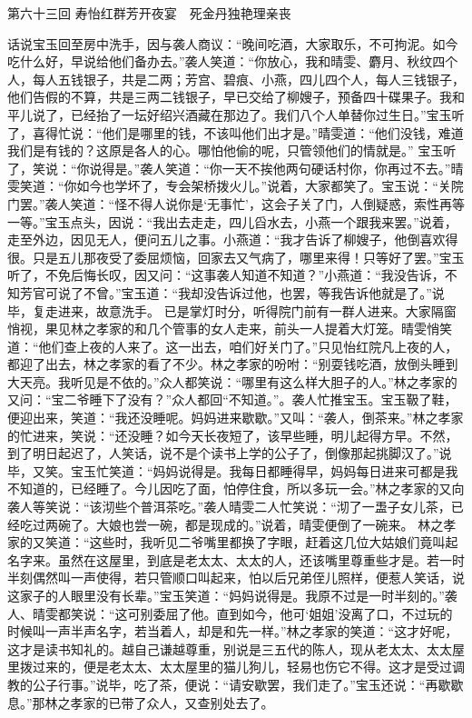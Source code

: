 \documentclass[12pt,oneside]{book}
\begin{document}
 
第六十三回  寿怡红群芳开夜宴　死金丹独艳理亲丧


话说宝玉回至房中洗手，因与袭人商议：“晚间吃酒，大家取乐，不可拘泥。如今吃什么好，早说给他们备办去。”袭人笑道：“你放心，我和晴雯、麝月、秋纹四个人，每人五钱银子，共是二两；芳宫、碧痕、小燕，四儿四个人，每人三钱银子，他们告假的不算，共是三两二钱银子，早已交给了柳嫂子，预备四十碟果子。我和平儿说了，已经抬了一坛好绍兴酒藏在那边了。我们八个人单替你过生日。”宝玉听了，喜得忙说：“他们是哪里的钱，不该叫他们出才是。”晴雯道：“他们没钱，难道我们是有钱的？这原是各人的心。哪怕他偷的呢，只管领他们的情就是。”
宝玉听了，笑说：“你说得是。”袭人笑道：“你一天不挨他两句硬话村你，你再过不去。”晴雯笑道：“你如今也学坏了，专会架桥拨火儿。”说着，大家都笑了。宝玉说：“关院门罢。”袭人笑道：“怪不得人说你是‘无事忙’，这会子关了门，人倒疑惑，索性再等一等。”宝玉点头，因说：“我出去走走，四儿舀水去，小燕一个跟我来罢。”说着，走至外边，因见无人，便问五儿之事。小燕道：“我才告诉了柳嫂子，他倒喜欢得很。只是五儿那夜受了委屈烦恼，回家去又气病了，哪里来得！只等好了罢。”宝玉听了，不免后悔长叹，因又问：“这事袭人知道不知道？”小燕道：“我没告诉，不知芳官可说了不曾。”宝玉道：“我却没告诉过他，也罢，等我告诉他就是了。”说毕，复走进来，故意洗手。
已是掌灯时分，听得院门前有一群人进来。大家隔窗悄视，果见林之孝家的和几个管事的女人走来，前头一人提着大灯笼。晴雯悄笑道：“他们查上夜的人来了。这一出去，咱们好关门了。”只见怡红院凡上夜的人，都迎了出去，林之孝家的看了不少。林之孝家的吩咐：“别耍钱吃酒，放倒头睡到大天亮。我听见是不依的。”众人都笑说：“哪里有这么样大胆子的人。”林之孝家的又问：“宝二爷睡下了没有？”众人都回“不知道。”。袭人忙推宝玉。宝玉靸了鞋，便迎出来，笑道：“我还没睡呢。妈妈进来歇歇。”又叫：“袭人，倒茶来。”林之孝家的忙进来，笑说：“还没睡？如今天长夜短了，该早些睡，明儿起得方早。不然，到了明日起迟了，人笑话，说不是个读书上学的公子了，倒像那起挑脚汉了。”说毕，又笑。宝玉忙笑道：“妈妈说得是。我每日都睡得早，妈妈每日进来可都是我不知道的，已经睡了。今儿因吃了面，怕停住食，所以多玩一会。”林之孝家的又向袭人等笑说：“该沏些个普洱茶吃。”袭人晴雯二人忙笑说：“沏了一盄子女儿茶，已经吃过两碗了。大娘也尝一碗，都是现成的。”说着，晴雯便倒了一碗来。
林之孝家的又笑道：“这些时，我听见二爷嘴里都换了字眼，赶着这几位大姑娘们竟叫起名字来。虽然在这屋里，到底是老太太、太太的人，还该嘴里尊重些才是。若一时半刻偶然叫一声使得，若只管顺口叫起来，怕以后兄弟侄儿照样，便惹人笑话，说这家子的人眼里没有长辈。”宝玉笑道：“妈妈说得是。我原不过是一时半刻的。”袭人、晴雯都笑说：“这可别委屈了他。直到如今，他可‘姐姐’没离了口，不过玩的时候叫一声半声名字，若当着人，却是和先一样。”林之孝家的笑道：“这才好呢，这才是读书知礼的。越自己谦越尊重，别说是三五代的陈人，现从老太太、太太屋里拨过来的，便是老太太、太太屋里的猫儿狗儿，轻易也伤它不得。这才是受过调教的公子行事。”说毕，吃了茶，便说：“请安歇罢，我们走了。”宝玉还说：“再歇歇息。”那林之孝家的已带了众人，又查别处去了。
\end{document}
